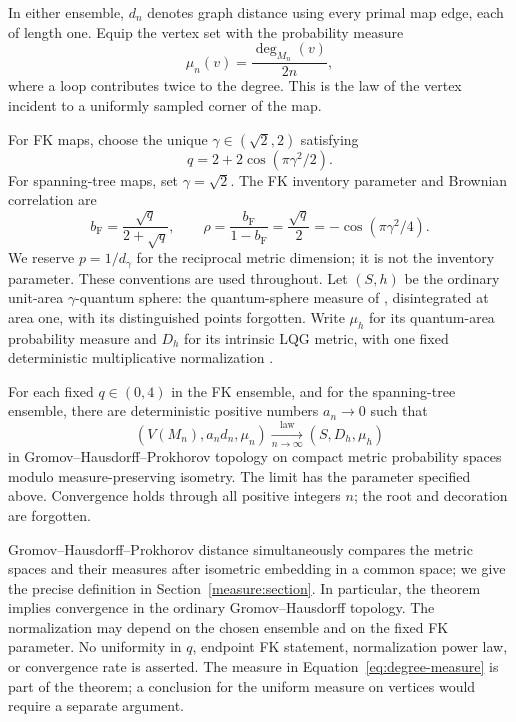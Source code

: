 In either ensemble, \(d_n\) denotes graph distance using every primal
map edge, each of length one. Equip the vertex set with the probability
measure
\begin{equation}\label{eq:degree-measure}
                  \mu_n(v)=\frac{\deg_{M_n}(v)}{2n},
\end{equation}
where a loop contributes twice to the degree. This is the law of the
vertex incident to a uniformly sampled corner of the map.

For FK maps, choose the unique \(\gamma\in(\sqrt2,2)\) satisfying
\begin{equation}\label{eq:q-gamma}
                 q=2+2\cos(\pi\gamma^2/2).
\end{equation}
For spanning-tree maps, set \(\gamma=\sqrt2\). The FK inventory parameter
and Brownian correlation are
\[
 b_{\mathrm F}=\frac{\sqrt q}{2+\sqrt q},\qquad
 \rho=\frac{b_{\mathrm F}}{1-b_{\mathrm F}}
      =\frac{\sqrt q}{2}=-\cos(\pi\gamma^2/4).
\]
We reserve \(p=1/d_\gamma\) for the reciprocal metric dimension; it is
not the inventory parameter. These conventions are used throughout.
Let \((S,h)\) be the
ordinary unit-area \(\gamma\)-quantum sphere: the quantum-sphere measure
of \cite[Definition~4.21(ii)]{DMS}, disintegrated at area one, with
its distinguished points forgotten. Write \(\mu_h\) for its quantum-area
probability measure and \(D_h\) for its intrinsic LQG metric, with one
fixed deterministic multiplicative normalization
\cite{GwynneMillerMetric,GwynneMillerConformal}.

\begin{theorem}\label{thm:main}\label{tree:thm:main}
For each fixed \(q\in(0,4)\) in the FK ensemble, and for the spanning-tree
ensemble, there are deterministic positive numbers \(a_n\to0\) such that
\[
          (V(M_n),a_nd_n,\mu_n)
             \xrightarrow[n\to\infty]{\mathrm{law}}
          (S,D_h,\mu_h)
\]
in Gromov--Hausdorff--Prokhorov topology on compact metric probability
spaces modulo measure-preserving isometry. The limit has the parameter
specified above. Convergence holds through all positive integers \(n\);
the root and decoration are forgotten.
\end{theorem}

Gromov--Hausdorff--Prokhorov distance simultaneously compares the metric
spaces and their measures after isometric embedding in a common space;
we give the precise definition in Section~\ref{measure:section}.
In particular, the theorem implies convergence in the ordinary
Gromov--Hausdorff topology. The normalization may depend on the chosen
ensemble and on the fixed FK parameter. No uniformity in \(q\), endpoint
FK statement, normalization power law, or convergence rate is asserted.
The measure in Equation~\eqref{eq:degree-measure} is part of the theorem;
a conclusion for the uniform measure on vertices would require a
separate argument.


